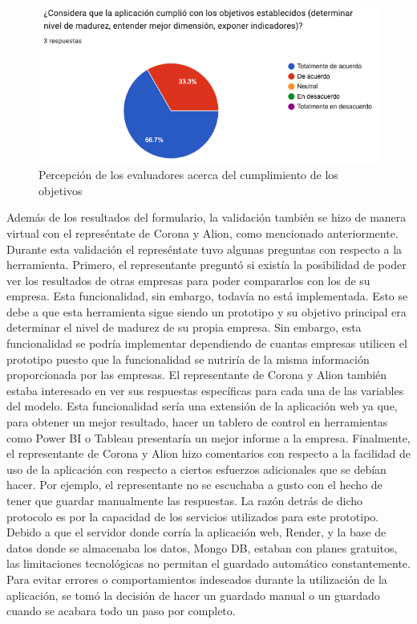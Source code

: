 \begin{figure}[H]
        \centering
        \includegraphics[scale=0.45]{images/6-validacion/12-utilidad.png}
        \caption{Percepción de los evaluadores acerca del cumplimiento de los objetivos}
\end{figure}

\hfill

Además de los resultados del formulario, la validación también se hizo de manera virtual con el represéntate de Corona y Alion, como mencionado anteriormente. Durante esta validación el represéntate tuvo algunas preguntas con respecto a la herramienta. Primero, el representante preguntó si existía la posibilidad de poder ver los resultados de otras empresas para poder compararlos con los de su empresa. Esta funcionalidad, sin embargo, todavía no está implementada. Esto se debe a que esta herramienta sigue siendo un prototipo y su objetivo principal era determinar el nivel de madurez de su propia empresa. Sin embargo, esta funcionalidad se podría implementar dependiendo de cuantas empresas utilicen el prototipo puesto que la funcionalidad se nutriría de la misma información proporcionada por las empresas. El representante de Corona y Alion también estaba interesado en ver sus respuestas específicas para cada una de las variables del modelo. Esta funcionalidad sería una extensión de la aplicación web ya que, para obtener un mejor resultado, hacer un tablero de control en herramientas como Power BI o Tableau presentaría un mejor informe a la empresa. Finalmente, el representante de Corona y Alion hizo comentarios con respecto a la facilidad de uso de la aplicación con respecto a ciertos esfuerzos adicionales que se debían hacer. Por ejemplo, el representante no se escuchaba a gusto con el hecho de tener que guardar manualmente las respuestas. La razón detrás de dicho protocolo es por la capacidad de los servicios utilizados para este prototipo. Debido a que el servidor donde corría la aplicación web, Render, y la base de datos donde se almacenaba los datos, Mongo DB, estaban con planes gratuitos, las limitaciones tecnológicas no permitan el guardado automático constantemente. Para evitar errores o comportamientos indeseados durante la utilización de la aplicación, se tomó la decisión de hacer un guardado manual o un guardado cuando se acabara todo un paso por completo.
